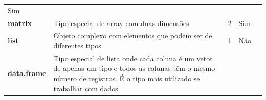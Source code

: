 \documentclass[]{book}
\begin{document}
\begin{longtable}[]{@{}lllll@{}}
\begin{minipage}[t]{0.05\columnwidth}
Sim\strut
\end{minipage} & \begin{minipage}[t]{0.05\columnwidth}\raggedright\strut
\strut
\end{minipage}\tabularnewline
\begin{minipage}[t]{0.05\columnwidth}\raggedright\strut
\textbf{matrix}\strut
\end{minipage} & \begin{minipage}[t]{0.06\columnwidth}\raggedright\strut
Tipo especial de array com duas dimensões\strut
\end{minipage} & \begin{minipage}[t]{0.05\columnwidth}\raggedright\strut
2\strut
\end{minipage} & \begin{minipage}[t]{0.05\columnwidth}\raggedright\strut
Sim\strut
\end{minipage} & \begin{minipage}[t]{0.05\columnwidth}\raggedright\strut
\strut
\end{minipage}\tabularnewline
\begin{minipage}[t]{0.05\columnwidth}\raggedright\strut
\textbf{list}\strut
\end{minipage} & \begin{minipage}[t]{0.06\columnwidth}\raggedright\strut
Objeto complexo com elementos que podem ser de diferentes tipos\strut
\end{minipage} & \begin{minipage}[t]{0.05\columnwidth}\raggedright\strut
1\strut
\end{minipage} & \begin{minipage}[t]{0.05\columnwidth}\raggedright\strut
Não\strut
\end{minipage} & \begin{minipage}[t]{0.05\columnwidth}\raggedright\strut
\strut
\end{minipage}\tabularnewline
\begin{minipage}[t]{0.05\columnwidth}\raggedright\strut
\textbf{data.frame}\strut
\end{minipage} & \begin{minipage}[t]{0.06\columnwidth}\raggedright\strut
Tipo especial de lista onde cada coluna é um vetor de apenas um tipo e
todos as colunas têm o mesmo número de registros. É o tipo mais
utilizado se trabalhar com dados\strut
\end{minipage} & \begin{minipage}[t]{0.05\columnwidth}\raggedright\strut

\end{minipage}
\end{longtable}
\end{document}
